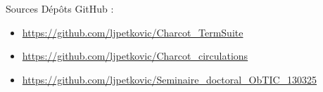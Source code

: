 \begin{frame}{Sources}
	Dépôts GitHub :
	\begin{itemize}
		\small
		\item \url{https://github.com/ljpetkovic/Charcot_TermSuite}
		\item \url{https://github.com/ljpetkovic/Charcot_circulations}
		\item \url{https://github.com/ljpetkovic/Seminaire_doctoral_ObTIC_130325}
	\end{itemize}
\end{frame}